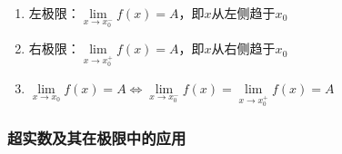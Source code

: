 \documentclass[../book.tex]{subfiles}
\begin{document}
\begin{enumerate}
\begin{tabular}{|c|p{3.2cm}|p{3.2cm}|p{3.2cm}|p{3.2cm}|}
            $x\to \infty$
            & $\begin{aligned}
                   &\forall\varepsilon>0,\ \exists N>0,\\
                   &|x|>N\\
                   &\Rightarrow |f(x)-A|<\varepsilon
            \end{aligned}$
            & $\begin{aligned}
                   &\forall M>0,\ \exists N>0,\\
                   &|x|>N\\
                   &\Rightarrow f(x)>M
            \end{aligned}$
            & $\begin{aligned}
                   &\forall M>0,\ \exists N>0,\\
                   &|x|>N\\
                   &\Rightarrow f(x)<-M
            \end{aligned}$
            & $\begin{aligned}
                   &\forall M>0,\ \exists N>0,\\
                   &|x|>N\\
                   &\Rightarrow |f(x)|>M
            \end{aligned}$
            \\ \hline
        \end{tabular}

        \item 左极限：$\lim\limits_{x \to x_0^-} f(x) = A$，即$x$从左侧趋于$x_0$

        \item 右极限：$\lim\limits_{x \to x_0^+} f(x) = A$，即$x$从右侧趋于$x_0$

        \item $\lim\limits_{x \to x_0} f(x) = A \iff \lim\limits_{x \to x_0^-} f(x) = \lim\limits_{x \to x_0^+} f(x) = A$
    \end{enumerate}

    \subsubsection{超实数及其在极限中的应用}
\end{document}
